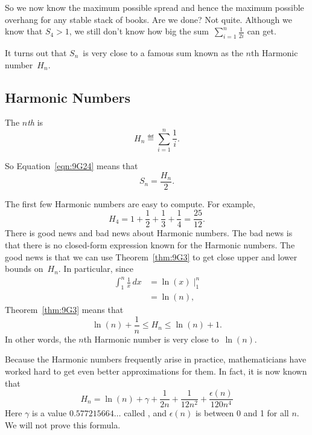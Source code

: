 So we now know the maximum possible spread and hence the maximum
possible overhang for any stable stack of books.  Are we done?  Not
quite.  Although we know that $S_4 > 1$, we still don't know how big
the sum~$\sum_{i = 1}^n \frac{1}{2i}$ can get.

It turns out that $S_n$~is very close to a famous sum known as the
$n$th Harmonic number~$H_n$.

\subsection{Harmonic Numbers}

\begin{definition}
The \emph{$n$th}  is
\[
    H_n \eqdef \sum_{i=1}^n \frac{1}{i}.
\]
\end{definition}
So Equation~\ref{eqn:9G24} means that
\begin{equation}\label{eqn:9G25}
    S_n = \frac{H_n}{2}.
\end{equation}

The first few Harmonic numbers are easy to compute.  For example,
\begin{equation*}
    H_4 = 1 + \frac{1}{2} + \frac{1}{3} + \frac{1}{4} = \frac{25}{12}.
\end{equation*}
There is good news and bad news about Harmonic numbers.  The bad news
is that there is no closed-form expression known for the Harmonic
numbers.  The good news is that we can use Theorem~\ref{thm:9G3} to
get close upper and lower bounds on~$H_n$.  In particular, since
\begin{align*}
\int_1^n \frac{1}{x} \, dx
    &= \ln(x) \; \Bigr|_1^n \\
    &= \ln(n),
\end{align*}
Theorem~\ref{thm:9G3} means that
\begin{equation}\label{eqn:9G30}
    \ln(n) + \frac{1}{n} \le H_n \le \ln(n) + 1.
\end{equation}
In other words, the $n$th Harmonic number is very close to~$\ln(n)$.

Because the Harmonic numbers frequently arise in practice,
mathematicians have worked hard to get even better approximations for
them.  In fact, it is now known that
\begin{equation}\label{eqn:9K2}
    H_n = \ln(n) + \gamma + \frac{1}{2n} + \frac{1}{12n^2} +
        \frac{\epsilon(n)}{120n^4}
\end{equation}
Here $\gamma$ is a value $0.577215664\dots$ called , and $\epsilon(n)$ is between 0 and 1 for all $n$.  We
will not prove this formula.

